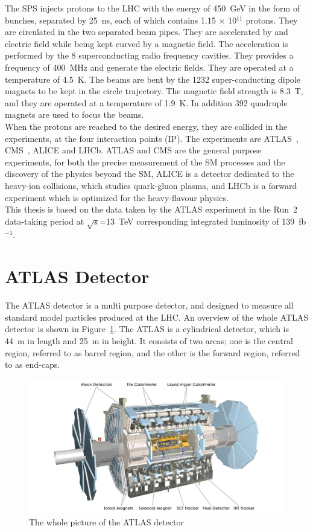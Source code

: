 The SPS injects protons to the LHC with the energy of 450~GeV in the form of bunches, separated by 25~ns, each of which contains 1.15 $\times$ 10$^{11}$ protons. They are circulated in the two separated beam pipes. They are accelerated by and electric field while being kept curved by a magnetic field. The acceleration is performed by the 8 superconducting radio frequency cavities. They provides a frequency of 400~MHz and generate the electric fields. They are operated at a temperature of 4.5~K. The beams are bent by the 1232 super-conducting dipole magnets to be kept in the circle trajectory. The magnetic field strength is 8.3~T, and they are operated at a temperature of 1.9~K. In addition 392 quadruple magnets are used to focus the beams. \\
When the protons are reached to the desired energy, they are collided in the experiments, at the four interaction points (IP). 
The experiments are ATLAS~\cite{PERF-2007-01}, CMS~\cite{CMS-TDR-08-001}, ALICE and LHCb. 
ATLAS and CMS are the general purpose experiments, for both the precise measurement of the SM processes and the discovery of the physics beyond the SM, ALICE is a detector dedicated to the heavy-ion collisions, which studies quark-gluon plasma, and LHCb is a forward experiment which is optimized for the heavy-flavour physics. \\
This thesis is based on the data taken by the ATLAS experiment in the Run~2 data-taking period at $\sqrt{s}$=13~TeV corresponding integrated luminosity of 139~fb$^{-1}$.

\section{ATLAS Detector}
\label{sec:detector}
The ATLAS detector is a multi purpose detector, and designed to measure all standard model particles produced at the LHC.
An overview of the whole ATLAS detector is shown in Figure~\ref{fig:ATLAS}.
The ATLAS is a cylindrical detector, which is 44~m in length and 25~m in height. It consists of two areas; one is the central region, referred to as barrel region, and the other is the forward region, referred to as end-caps.
\begin{figure}[tbp]
\begin{center}
 \includegraphics[width=1.0\textwidth,keepaspectratio]{figures/detector/ATLAS}
\caption{
The whole picture of the ATLAS detector
}
\label{fig:ATLAS}
\end{center}
\end{figure}

